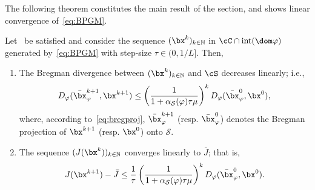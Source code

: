 \documentclass[11pt]{amsart}
\begin{document}
The following theorem constitutes the main result of the section, and shows linear convergence of~\cref{eq:BPGM}.
\begin{theorem}\label{thm:lin_conv_rate}
Let~ be satisfied and consider the sequence $(\bx^k )_{k\in\mathbb{N}}$ in $\cC\cap \mathrm{int}(\dom \varphi)$ generated by~\cref{eq:BPGM} with step-size $\tau\in(0,1/L]$. Then, 
\begin{enumerate}[label=(\roman*),leftmargin=*]
\item\label{item1mainthm} The Bregman divergence between $(\bx^k)_{k\in\mathbb{N}}$ and  $\cS$ decreases linearly; i.e.,
\begin{equation}\label{eq:linear_conv_full_rank}
D_{\varphi}(\bar\bx^{k+1}_{\varphi},\bx^{k+1})\leq \left(\frac{1}{1+\alpha_\mathcal{S}(\varphi)\tau\mu}\right)^k D_{\varphi}(\bar\bx^{0}_{\varphi},\bx^{0}),
\end{equation}
where, according to~\cref{eq:bregproj}, $\bar \bx^{k+1}_{\varphi}$ (resp. $\bar \bx_{\varphi}^0$) denotes the Bregman projection of $\bx^{k+1}$ (resp. $\bx^0$) onto $\mathcal{S}$.
\item\label{item2mainthm} The sequence $(J(\bx^k))_{k\in\mathbb{N}}$ converges linearly to $\bar J$; that is,
\begin{equation}\label{eq:linconv func values}
J(\bx^{k+1})-\bar J\leq \frac{1}{\tau}\left(\frac{1}{1+\alpha_\mathcal{S}(\varphi)\tau\mu}\right)^kD_{\varphi}(\bar\bx^0_{\varphi},\bx^0).
\end{equation}
\end{enumerate}
\end{theorem}
\end{document}

